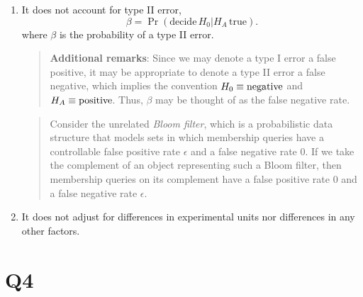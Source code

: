\documentclass[
  11pt,
]{article}
\begin{document}
\begin{enumerate}
\def\labelenumi{\arabic{enumi}.}
\item
  It does not account for type II error, \[
      \beta = \Pr(\text{decide} \, H_0 | H_A \, \text{true}).
  \] where \(\beta\) is the probability of a type II error.

  \begin{quote}
  \textbf{Additional remarks}: Since we may denote a type I error a
  false positive, it may be appropriate to denote a type II error a
  false negative, which implies the convention
  \(H_0 \equiv \rm{negative}\) and \(H_A \equiv \rm{positive}\). Thus,
  \(\beta\) may be thought of as the false negative rate.
  \end{quote}

  \begin{quote}
  Consider the unrelated \emph{Bloom filter}, which is a probabilistic
  data structure that models sets in which membership queries have a
  controllable false positive rate \(\epsilon\) and a false negative
  rate \(0\). If we take the complement of an object representing such a
  Bloom filter, then membership queries on its complement have a false
  positive rate \(0\) and a false negative rate \(\epsilon\).
  \end{quote}
\item
  It does not adjust for differences in experimental units nor
  differences in any other factors.
\end{enumerate}

\hypertarget{q4}{%
\section{Q4}\label{q4}}

\end{document}
